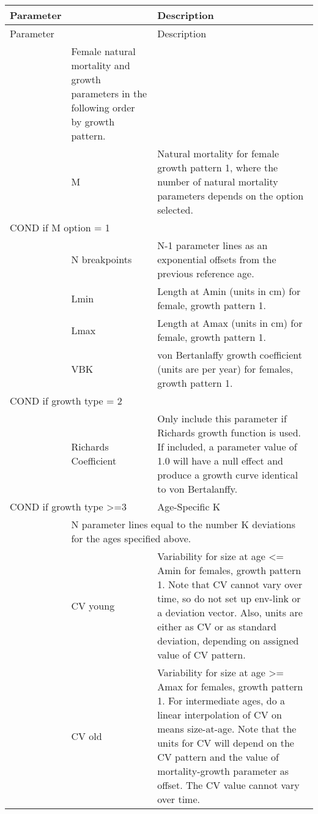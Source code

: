 \begin{longtable}{p{1cm} p{2.25cm} p{10cm}}
	\hline
	Parameter& & Description\Tstrut\Bstrut\\
	\hline
	\endfirsthead

	\hline
	Parameter& & Description\Tstrut\Bstrut\\
	\hline
	\endhead

	\hline
	\endfoot

	\endlastfoot

	\multicolumn{2}{l}{Females}\Tstrut & Female natural mortality and growth parameters in the following order by growth pattern.\\
	& M & Natural mortality for female growth pattern 1, where the number of natural mortality parameters depends on the option selected.\Bstrut\\
	\hline
	\multicolumn{2}{l}{COND if M option = 1 } & \Tstrut\\
	& N breakpoints & N-1 parameter lines as an exponential offsets from the previous reference age.\Bstrut\\
	\hline

	& Lmin & Length at Amin (units in cm) for female, growth pattern 1. \\
	& Lmax & Length at Amax (units in cm) for female, growth pattern 1. \\
	& VBK & von Bertanlaffy growth coefficient (units are per year) for females, growth pattern 1.\Bstrut\\
	\hline

	\multicolumn{2}{l}{COND if growth type = 2 } & \Tstrut\\
	& Richards Coefficient & Only include this parameter if Richards growth function is used.  If included, a parameter value of 1.0 will have a null effect and produce a growth curve identical to von Bertalanffy.\\

	\multicolumn{2}{l}{COND if growth type >=3 } & Age-Specific K\\
	& \multicolumn{2}{l}{N parameter lines equal to the number K deviations for the ages specified above.}\Bstrut\\
	\hline

    \Tstrut & CV young & Variability for size at age <= Amin for females, growth pattern 1.  Note that CV cannot vary over time, so do not set up env-link or a deviation vector.  Also, units are either as CV or as standard deviation, depending on assigned value of CV pattern.\\
	& CV old & Variability for size at age >= Amax for females, growth pattern 1. For intermediate ages, do a linear interpolation of CV on means size-at-age.  Note that the units for CV will depend on the CV pattern and the value of mortality-growth parameter as offset. The CV value cannot vary over time.\Bstrut\\
	\hline


\end{longtable}
